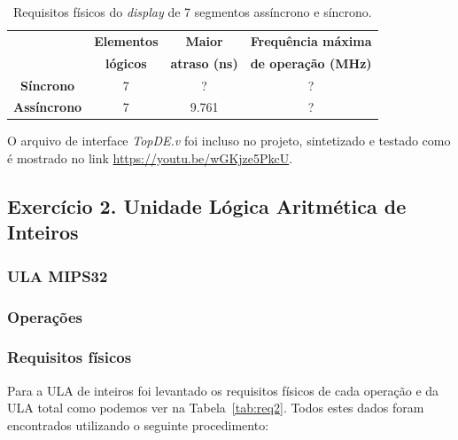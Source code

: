 \documentclass[12pt]{article}
\begin{document}

\begin{table}[H]
	\centering
	\begin{tabular}{|c|c|c|c|}
		\hline
		& \textbf{Elementos} & \textbf{Maior} & \textbf{Frequência máxima} \\
		& \textbf{lógicos} & \textbf{atraso (ns)} & \textbf{de operação (MHz)} \\\hline
		\hline
		\textbf{Síncrono} & 7 & ? & ? \\\hline
		\textbf{Assíncrono} & 7 & 9.761 & ? \\\hline
	\end{tabular}
	\caption{Requisitos físicos do \textit{display} de 7 segmentos assíncrono e síncrono.}
	\label{tab:req1}
\end{table}

O arquivo de interface \textit{TopDE.v} foi incluso no projeto, sintetizado e testado como é mostrado no link \url{https://youtu.be/wGKjze5PkcU}.

\subsection{Exercício 2. Unidade Lógica Aritmética de Inteiros}
\label{subsec:ulaint}

\subsubsection{ULA MIPS32}
\label{subsubsec:ulamips32}


\subsubsection{Operações}
\label{subsubsec:2op}


\subsubsection{Requisitos físicos}
\label{subsubsec:ulafis}

Para a ULA de inteiros foi levantado os requisitos físicos de cada operação e da ULA total como podemos ver na Tabela~\ref{tab:req2}. Todos estes dados foram encontrados utilizando o seguinte procedimento:
\end{document}
